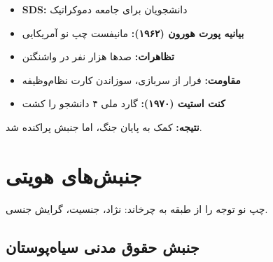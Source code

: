 \begin{historybox}
\begin{itemize}[nosep]
    \item \textbf{SDS:} دانشجویان برای جامعه دموکراتیک
    \item \textbf{بیانیه پورت هورون (۱۹۶۲):} مانیفست چپ نو آمریکایی
    \item \textbf{تظاهرات:} صدها هزار نفر در واشنگتن
    \item \textbf{مقاومت:} فرار از سربازی، سوزاندن کارت نظام‌وظیفه
    \item \textbf{کنت استیت (۱۹۷۰):} گارد ملی ۴ دانشجو را کشت
\end{itemize}

\textbf{نتیجه:} کمک به پایان جنگ، اما جنبش پراکنده شد.
\end{historybox}

\section{جنبش‌های هویتی}

چپ نو توجه را از طبقه به  چرخاند: نژاد، جنسیت، گرایش جنسی.

\subsection{جنبش حقوق مدنی سیاه‌پوستان}

